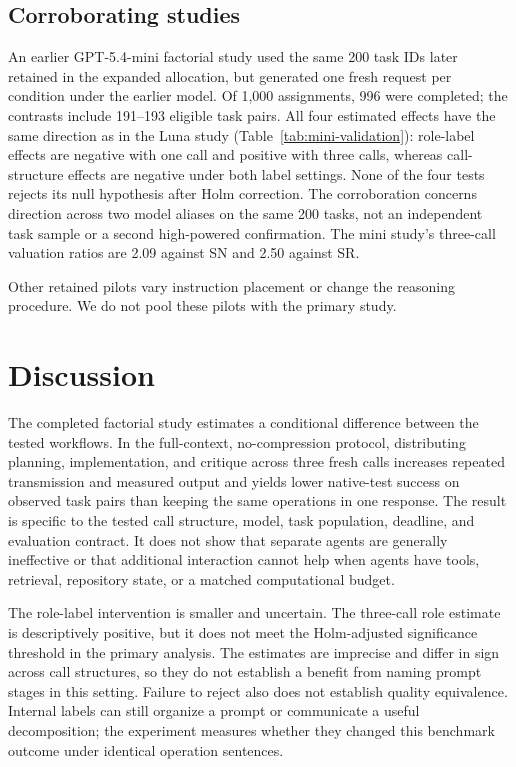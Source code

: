 


\subsection{Corroborating studies}
An earlier GPT-5.4-mini factorial study used the same 200 task IDs later retained in the expanded allocation, but generated one fresh request per condition under the earlier model. Of 1,000 assignments, 996 were completed; the contrasts include 191--193 eligible task pairs. All four estimated effects have the same direction as in the Luna study (Table~\ref{tab:mini-validation}): role-label effects are negative with one call and positive with three calls, whereas call-structure effects are negative under both label settings. None of the four tests rejects its null hypothesis after Holm correction. The corroboration concerns direction across two model aliases on the same 200 tasks, not an independent task sample or a second high-powered confirmation. The mini study's three-call valuation ratios are 2.09 against SN and 2.50 against SR.



Other retained pilots vary instruction placement or change the reasoning procedure. We do not pool these pilots with the primary study.



\section{Discussion}
The completed factorial study estimates a conditional difference between the tested workflows. In the full-context, no-compression protocol, distributing planning, implementation, and critique across three fresh calls increases repeated transmission and measured output and yields lower native-test success on observed task pairs than keeping the same operations in one response. The result is specific to the tested call structure, model, task population, deadline, and evaluation contract. It does not show that separate agents are generally ineffective or that additional interaction cannot help when agents have tools, retrieval, repository state, or a matched computational budget.

The role-label intervention is smaller and uncertain. The three-call role estimate is descriptively positive, but it does not meet the Holm-adjusted significance threshold in the primary analysis. The estimates are imprecise and differ in sign across call structures, so they do not establish a benefit from naming prompt stages in this setting. Failure to reject also does not establish quality equivalence. Internal labels can still organize a prompt or communicate a useful decomposition; the experiment measures whether they changed this benchmark outcome under identical operation sentences.

